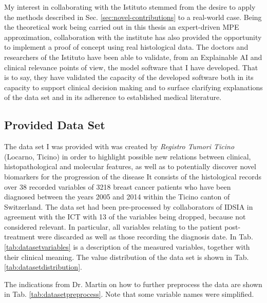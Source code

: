 
My interest in collaborating with the Istituto stemmed from the desire to apply the methods described in Sec. \ref{sec:novel-contributions} to a real-world case.
Being the theoretical work being carried out in this thesis an expert-driven MPE approximation, collaboration with the institute has also provided the opportunity to implement a proof of concept using real histological data.
The doctors and researchers of the Istituto have been able to validate, from an Explainable AI and clinical relevance points of view, the model software that I have developed.
That is to say, they have validated the capacity of the developed software both in its capacity to support clinical decision making and to surface clarifying explanations of the data set and in its adherence to established medical literature.


\subsection{Provided Data Set}
The data set I was provided with was created by \textit{Registro Tumori Ticino} (Locarno, Ticino) in order to highlight possible new relations between clinical, histopathological and molecular features, as well as to potentially discover novel biomarkers for the progression of the disease 
It consists of the histological records over 38 recorded variables of 3218 breast cancer patients who have been diagnosed between the years 2005 and 2014 within the Ticino canton of Switzerland.
The data set had been pre-processed by collaborators of IDSIA in agreement with the ICT with 13 of the variables being dropped, because not considered relevant.
In particular, all variables relating to the patient post-treatment were discarded as well as those recording the diagnosis date.
In Tab. \ref{tab:datasetvariables} is a description of the measured variables, together with their clinical meaning.
The value distribution of the data set is shown in Tab. \ref{tab:datasetdistribution}.

The indications from Dr. Martin on how to further preprocess the data are shown in Tab. \ref{tab:datasetpreprocess}.
Note that some variable names were simplified.


